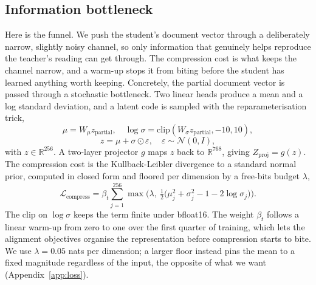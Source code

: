 \documentclass[conference]{IEEEtran}
\begin{document}
\subsection{Information bottleneck}
Here is the funnel. We push the student's document vector through a deliberately
narrow, slightly noisy channel, so only information that genuinely helps reproduce
the teacher's reading can get through. The compression cost is what keeps the channel
narrow, and a warm-up stops it from biting before the student has learned anything
worth keeping. Concretely, the partial document vector is passed through a stochastic
bottleneck. Two linear
heads produce a mean and a log standard deviation, and a latent code is sampled with
the reparameterisation trick,
\begin{equation}
\label{eq:ib}
\mu = W_\mu z_{\mathrm{partial}}, \quad
\log\sigma = \mathrm{clip}(W_\sigma z_{\mathrm{partial}}, -10, 10),
\end{equation}
\begin{equation}
z = \mu + \sigma \odot \varepsilon, \quad \varepsilon \sim \mathcal{N}(0, I),
\end{equation}
with $z \in \mathbb{R}^{256}$. A two-layer projector $g$ maps $z$ back to
$\mathbb{R}^{768}$, giving $Z_{\mathrm{proj}} = g(z)$. The compression cost is the
Kullback-Leibler divergence to a standard normal prior, computed in closed form and
floored per dimension by a free-bits budget $\lambda$,
\begin{equation}
\label{eq:compress}
\mathcal{L}_{\mathrm{compress}} = \beta_t \sum_{j=1}^{256}
\max\!\Big(\lambda,\ \tfrac{1}{2}\big(\mu_j^2 + \sigma_j^2 - 1 - 2\log\sigma_j\big)\Big).
\end{equation}
The clip on $\log\sigma$ keeps the term finite under bfloat16. The weight $\beta_t$
follows a linear warm-up from zero to one over the first quarter of training, which
lets the alignment objectives organise the representation before compression starts
to bite. We use $\lambda = 0.05$ nats per dimension; a larger floor instead pins the
mean to a fixed magnitude regardless of the input, the opposite of what we want
(Appendix~\ref{app:loss}).
\end{document}
